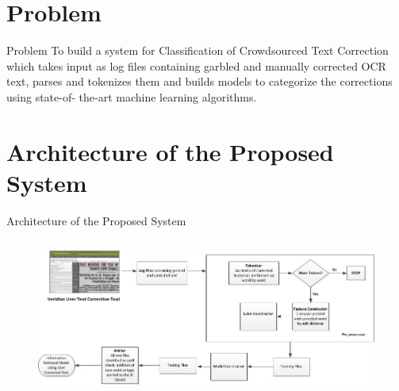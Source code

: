 \documentclass{beamer}
\begin{document}
\section{Problem}
\begin{frame}{Problem}
To build a system for Classification of Crowdsourced Text Correction which takes input as log files containing garbled and manually corrected OCR text, parses and tokenizes them and builds models to categorize the corrections using state-of- the-art machine learning algorithms.
\end{frame}


\section{Architecture of the Proposed System}
\begin{frame}{Architecture of the Proposed System}
\begin{columns}
\begin{figure}[ht]
\begin{center}
\includegraphics[height=1.7 in]{images/archOCR.jpg}
\end{center}
\end{figure}
\end{columns}
\end{frame}
\end{document}
